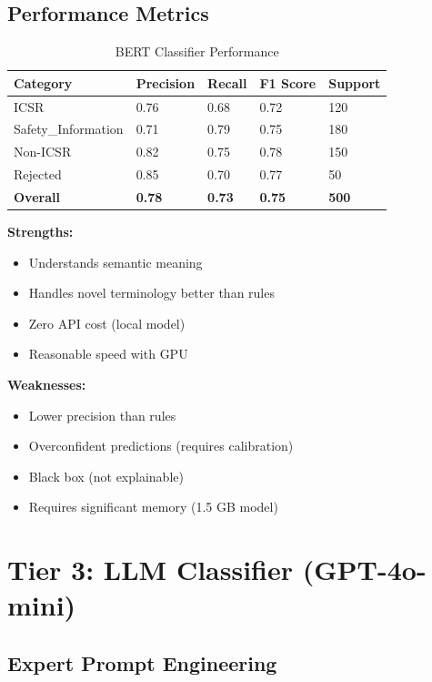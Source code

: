 \subsection{Performance Metrics}

\begin{table}[h]
\centering
\caption{BERT Classifier Performance}
\begin{tabularx}{\textwidth}{lXXXX}
\toprule
\textbf{Category} & \textbf{Precision} & \textbf{Recall} & \textbf{F1 Score} & \textbf{Support} \\
\midrule
ICSR & 0.76 & 0.68 & 0.72 & 120 \\
Safety\_Information & 0.71 & 0.79 & 0.75 & 180 \\
Non-ICSR & 0.82 & 0.75 & 0.78 & 150 \\
Rejected & 0.85 & 0.70 & 0.77 & 50 \\
\textbf{Overall} & \textbf{0.78} & \textbf{0.73} & \textbf{0.75} & \textbf{500} \\
\bottomrule
\end{tabularx}
\end{table}

\textbf{Strengths:}
\begin{itemize}
    \item Understands semantic meaning
    \item Handles novel terminology better than rules
    \item Zero API cost (local model)
    \item Reasonable speed with GPU
\end{itemize}

\textbf{Weaknesses:}
\begin{itemize}
    \item Lower precision than rules
    \item Overconfident predictions (requires calibration)
    \item Black box (not explainable)
    \item Requires significant memory (1.5 GB model)
\end{itemize}

\section{Tier 3: LLM Classifier (GPT-4o-mini)}

\subsection{Expert Prompt Engineering}

